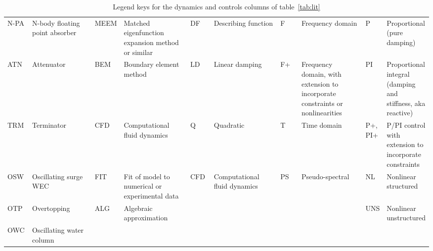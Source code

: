 \begin{longtable}


\hline 
\caption{Comparison of the disciplinary scope and modeling fidelity of previous WEC models used for optimization}
\label{tab:lit}
\end{longtable}

\begin{landscape}
\begingroup
\begin{table}
    \centering
    \begin{tabular}{>{\centering\arraybackslash}p{0.065\linewidth}>{\raggedright\arraybackslash}p{0.19\linewidth}|>{\centering\arraybackslash}p{0.065\linewidth}>{\raggedright\arraybackslash}p{0.19\linewidth}|>{\centering\arraybackslash}p{0.065\linewidth}>{\raggedright\arraybackslash}p{0.19\linewidth}|>{\centering\arraybackslash}p{0.065\linewidth}>{\raggedright\arraybackslash}p{0.19\linewidth}|>{\centering\arraybackslash}p{0.065\linewidth}>{\raggedright\arraybackslash}p{0.19\linewidth}}
         \multicolumn{2}{c|}{Device}&  \multicolumn{2}{c|}{Hydro}&  \multicolumn{2}{c|}{Drag} &\multicolumn{2}{c|}{Domain} & \multicolumn{2}{c}{Controls} \\ \hline
         N-PA&  N-body floating point absorber&  MEEM&  Matched eigenfunction expansion method or similar &  DF& Describing function & F&Frequency domain & P&Proportional (pure damping) \\
         ATN&  Attenuator&  BEM&  Boundary element method&  LD& Linear damping & F+&Frequency domain, with extension to incorporate constraints or nonlinearities & PI&Proportional integral (damping and stiffness, aka reactive) \\
         TRM&  Terminator&  CFD&  Computational fluid dynamics&  Q& Quadratic & T&Time domain & P+, PI+&P/PI control with extension to incorporate constraints \\
         OSW&  Oscillating surge WEC&  FIT&  Fit of model to numerical or experimental data&  CFD& Computational fluid dynamics & PS&Pseudo-spectral& NL&Nonlinear structured \\
         OTP&  Overtopping&  ALG&  Algebraic approximation&  &  & & & UNS&Nonlinear unstructured \\
        OWC& Oscillating water column& & & & & & & & \\
    \end{tabular}
    \caption{Legend keys for the dynamics and controls columns of table~\ref{tab:lit}}
    \label{tab:lit-review-legend-dynam}
\end{table}
\endgroup
\end{landscape}

